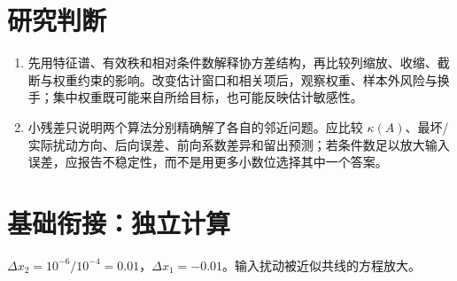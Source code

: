 \section*{研究判断}
\begin{enumerate}[nosep,leftmargin=*,start=10]
\item 先用特征谱、有效秩和相对条件数解释协方差结构，再比较列缩放、收缩、截断与权重约束的影响。改变估计窗口和相关项后，观察权重、样本外风险与换手；集中权重既可能来自所给目标，也可能反映估计敏感性。
\item 小残差只说明两个算法分别精确解了各自的邻近问题。应比较 $\kappa(A)$、最坏/实际扰动方向、后向误差、前向系数差异和留出预测；若条件数足以放大输入误差，应报告不稳定性，而不是用更多小数位选择其中一个答案。
\end{enumerate}


\MFQMappedUpperFourteenSolutions


\section*{基础衔接：独立计算}
$\Delta x_2=10^{-6}/10^{-4}=0.01$，$\Delta x_1=-0.01$。输入扰动被近似共线的方程放大。
